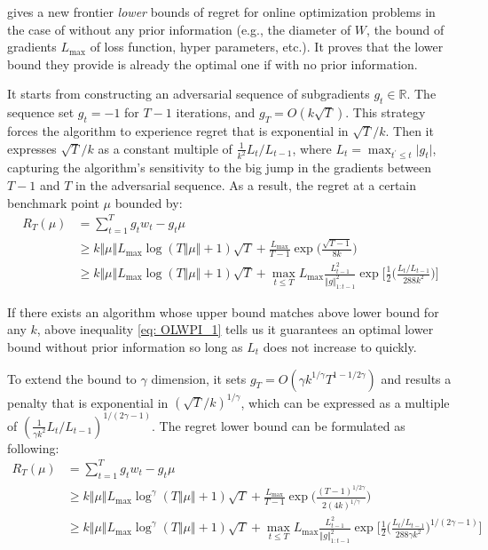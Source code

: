 \cite{Cutkosky2017} gives a new frontier \textit{lower} bounds of regret for online optimization problems in the case of without any prior information (e.g., the diameter of $W$, the bound of gradients $L_{\max}$ of loss function, hyper parameters, etc.). It proves that the lower bound they provide is already the optimal one if with no prior information. 

It starts from constructing an adversarial sequence of subgradients $g_t \in \mathbb{R}$. The sequence set $g_t=-1$ for $T-1$ iterations, and $g_T=O(k\sqrt{T})$. This strategy forces the algorithm to experience regret that is exponential in $\sqrt{T}/k$. Then it expresses $\sqrt{T}/k$ as a constant multiple of $\frac{1}{k^2}L_t/L_{t-1}$, where $L_t = \max_{t^{'} \leq t} \vert g_t \vert$, capturing the algorithm's sensitivity to the big jump in the gradients between $T-1$ and $T$ in the adversarial sequence. As a result, the regret at a certain benchmark point $\mu$ bounded by:
\begin{equation}\label{eq: OLWPI_1}
    \begin{aligned}
    R_T(\mu) & = \sum_{t=1}^{T}g_t w_t - g_t\mu \\
             & \geq k\Vert\mu\Vert L_{\max}\log(T\Vert \mu \Vert + 1)\sqrt{T} + \frac{L_{\max}}{T-1}\exp \bigg(\frac{\sqrt{T-1}}{8k}\bigg) \\
             & \geq k\Vert\mu\Vert L_{\max}\log(T\Vert \mu \Vert + 1)\sqrt{T} + \max_{t \leq T}L_{\max}\frac{L_{t-1}^2}{{\Vert g \Vert}_{1:t-1}^2}\exp\bigg[\frac{1}{2}\bigg(\frac{L_t/L_{t-1}}{288k^2}\bigg)\bigg]
    \end{aligned}
\end{equation}

If there exists an algorithm whose upper bound matches above lower bound for any $k$, above inequality \ref{eq: OLWPI_1} tells us it guarantees an optimal lower bound without prior information so long as $L_t$ does not increase to quickly.

To extend the bound to $\gamma$ dimension, it sets $g_T=O(\gamma k^{1/\gamma}T^{1-1/{2\gamma}})$ and results a penalty that is exponential in $(\sqrt{T}/k)^{1/\gamma}$, which can be expressed as a multiple of $(\frac{1}{\gamma k^2}L_t/L_{t-1})^{1/(2\gamma-1)}$. The regret lower bound can be formulated as following:
\begin{equation}\label{eq: OLWPI_2}
    \begin{aligned}
    R_T(\mu) & = \sum_{t=1}^{T}g_t w_t - g_t\mu \\
             & \geq k\Vert\mu\Vert L_{\max}\log^\gamma(T\Vert \mu \Vert + 1)\sqrt{T} + \frac{L_{\max}}{T-1}\exp \bigg(\frac{(T-1)^{1/{2\gamma}}}{2(4k)^{1/\gamma}}\bigg) \\
             & \geq k\Vert\mu\Vert L_{\max}\log^\gamma(T\Vert \mu \Vert + 1)\sqrt{T} + \max_{t \leq T}L_{\max}\frac{L_{t-1}^2}{{\Vert g \Vert}_{1:t-1}^2}\exp\bigg[\frac{1}{2}\bigg(\frac{L_t/L_{t-1}}{288\gamma k^2}\bigg)^{1/(2\gamma-1)}\bigg]
    \end{aligned}
\end{equation}

